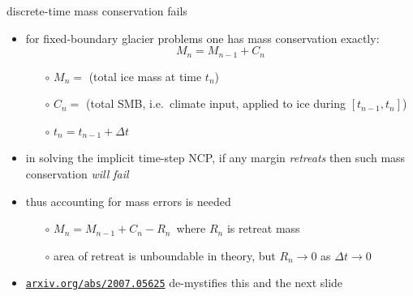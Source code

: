 \documentclass[10pt,hyperref,dvipsnames]{beamer}
\begin{document}
\begin{frame}{discrete-time mass conservation fails}

\begin{itemize}
\item for fixed-boundary glacier problems one has mass conservation exactly:
   $$M_n = M_{n-1} + C_n$$

    \begin{itemize}
    \item[$\circ$] $M_n =$ (total ice mass at time $t_n$)
    \item[$\circ$] $C_n =$ (total SMB, i.e.~climate input, applied to ice during $[t_{n-1},t_n]$)
    \item[$\circ$] $t_n=t_{n-1}+\Delta t$
    \end{itemize}
\item in solving the implicit time-step NCP, if any margin \emph{retreats} then such mass conservation \emph{will fail}
\item thus accounting for mass errors is needed
    \begin{itemize}
    \item[$\circ$] $M_n = M_{n-1} + C_n - R_n$\, where $R_n$ is retreat mass
    \item[$\circ$] area of retreat is unboundable in theory, but $R_n\to 0$ as $\Delta t\to 0$
    \end{itemize}

\vspace{10mm}
\item<2> \small \href{https://arxiv.org/abs/2007.05625}{\texttt{arxiv.org/abs/2007.05625}} de-mystifies this and the next slide
\end{itemize}
\end{frame}
\end{document}
